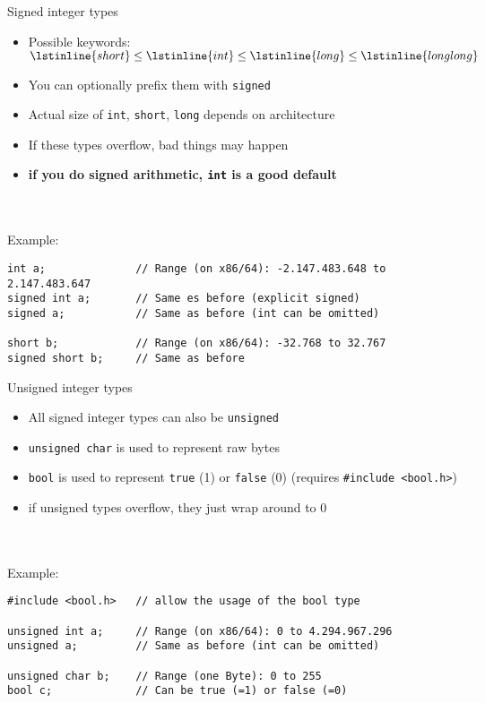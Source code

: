 \begin{frame}[fragile]{Signed integer types}
    \begin{itemize}
        \item Possible keywords: $\lstinline{short} \le \lstinline{int} \le \lstinline{long} \le \lstinline{long long}$
        \item You can optionally prefix them with \lstinline{signed}
        \item Actual size of \lstinline{int}, \lstinline{short}, \lstinline{long} depends on architecture
        \item If these types overflow, bad things may happen
        \item \textbf{if you do signed arithmetic, \lstinline{int} is a good default}
    \end{itemize}\ \\
    \ \\
    Example:
    \begin{lstlisting}[numbers=none]
int a;              // Range (on x86/64): -2.147.483.648 to 2.147.483.647
signed int a;       // Same es before (explicit signed)
signed a;           // Same as before (int can be omitted)

short b;            // Range (on x86/64): -32.768 to 32.767
signed short b;     // Same as before
\end{lstlisting}
\end{frame}

\begin{frame}[fragile]{Unsigned integer types}
    \begin{itemize}
        \item All signed integer types can also be \lstinline{unsigned}
        \item \lstinline{unsigned char} is used to represent raw bytes
        \item \lstinline{bool} is used to represent \lstinline{true} {\small(1)} or \lstinline{false} {\small(0)} \hspace*{1em}(requires \lstinline{#include <bool.h>})
        \item if unsigned types overflow, they just wrap around to 0
    \end{itemize}\ \\
    \ \\
    Example:
    \begin{lstlisting}[numbers=none]
#include <bool.h>   // allow the usage of the bool type

unsigned int a;     // Range (on x86/64): 0 to 4.294.967.296
unsigned a;         // Same as before (int can be omitted)

unsigned char b;    // Range (one Byte): 0 to 255
bool c;             // Can be true (=1) or false (=0)
\end{lstlisting}
\end{frame}

